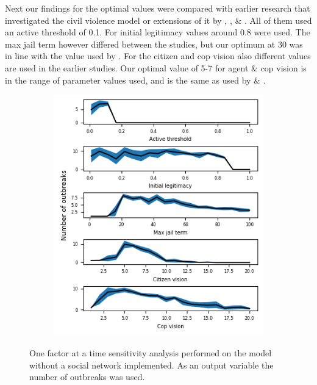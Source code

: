 \documentclass[10pt]{article}
\begin{document}
    Next our findings for the optimal values were compared with earlier research that investigated the civil violence model or extensions of it by \cite{epstein2002}, \cite{fonoberova2019}, \cite{huang2018} \& \cite{lemos2015}. All of them used an active threshold of 0.1. For initial legitimacy values around 0.8 were used. The max jail term however differed between the studies, but our optimum at 30 was in line with the value used by \cite{lemos2015}. For the citizen and cop vision also different values are used in the earlier studies. Our optimal value of 5-7 for agent \& cop vision is in the range of parameter values used, and is the same as used by \cite{lemos2015} \& \cite{epstein2002}.

    \begin{figure}[h]
        \centering
        \begin{subfigure}[b]{.4\linewidth}
            \includegraphics[width=\textwidth]{pictures/Sensitivity_analysis/Local SA2.png}
        \end{subfigure}
        \captionsetup{width=.5\linewidth}
        \caption{One factor at a time sensitivity analysis performed on the model without a social network implemented. As an output variable the number of outbreaks was used.}
        \label{fig:SA}
    \end{figure}
\end{document}

